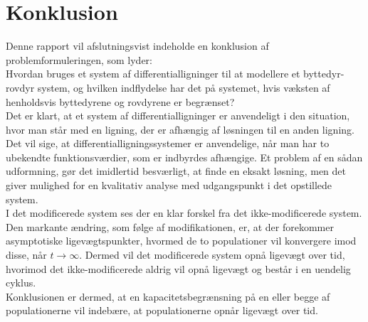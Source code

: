 \chapter{Konklusion}
Denne rapport vil afslutningsvist indeholde en konklusion af problemformuleringen, som lyder:\\
\hfill \break
Hvordan bruges et system af differentialligninger til at modellere et byttedyr-rovdyr system, og hvilken indflydelse har det på systemet, hvis væksten af henholdsvis byttedyrene og rovdyrene er begrænset?\\
\hfill \break
Det er klart, at et system af differentialligninger er anvendeligt i den situation, hvor man står med en ligning, der er afhængig af løsningen til en anden ligning. Det vil sige, at differentialligningssystemer er anvendelige, når man har to ubekendte funktionsværdier, som er indbyrdes afhængige. Et problem af en sådan udformning, gør det imidlertid besværligt, at finde en eksakt løsning, men det giver mulighed for en kvalitativ analyse med udgangspunkt i det opstillede system.\\
\hfill \break
I det modificerede system ses der en klar forskel fra det ikke-modificerede system. Den markante ændring, som følge af modifikationen, er, at der forekommer asymptotiske ligevægtspunkter, hvormed de to populationer vil konvergere imod disse, når $t \to \infty$. Dermed vil det modificerede system opnå ligevægt over tid, hvorimod det ikke-modificerede aldrig vil opnå ligevægt og består i en uendelig cyklus.\\
\hfill \break
Konklusionen er dermed, at en kapacitetsbegrænsning på en eller begge af populationerne vil indebære, at populationerne opnår ligevægt over tid.